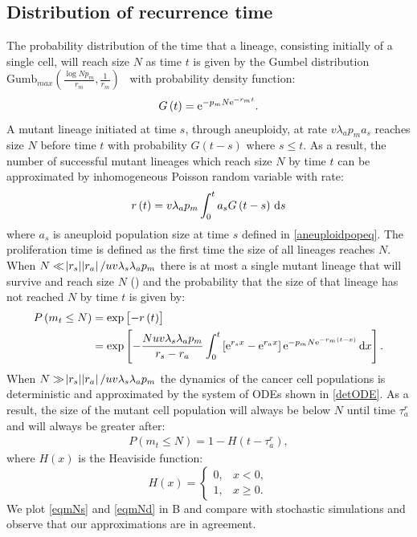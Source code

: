 \documentclass[12pt]{extarticle}
\renewcommand{\d}[1]{\ensuremath{\operatorname{d}\!{#1}}}
\renewcommand{\d}{{\rm d}}
\newcommand{\e}{{\rm e}}
\renewcommand{\Delta}{r}
\begin{document}
\begin{appendices}
\section{Distribution of recurrence time}
The probability distribution of the time that a lineage, consisting initially of a single cell, will reach size $N$ as time $t$ is given by the Gumbel distribution $\text{Gumb}_{max}\left(\frac{\log Np_m}{\Delta_m},\frac{1}{\Delta_m}\right)$~\citep{avanzini2019cancer} with probability density function:
\begin{align*}
G\left(t\right)=\e^{-p_mN\e^{-\Delta_mt}}.
\end{align*}
A mutant lineage initiated at time $s$, through aneuploidy, at rate $v\lambda_ap_ma_s$ reaches size $N$ before time $t$ with probability $G\left(t-s\right)$ where $s\leq t$. As a result, the number of successful mutant lineages which reach size $N$ by time $t$ can be approximated by inhomogeneous Poisson random variable with rate:
\begin{align*}
r\left(t\right)=v\lambda_ap_m\int_0^t a_sG\left(t-s\right)\,\d s
\end{align*}
where $a_s$ is aneuploid population size at time $s$ defined in \cref{aneuploidpopeq}. The proliferation time is defined as the first time the size of all lineages reaches $N$. When $N\ll\abs{\Delta_s}\abs{\Delta_a}/uv\lambda_s\lambda_ap_m$ there is at most a single mutant lineage that will survive and reach size $N$ () and the probability that the size of that lineage has not reached $N$ by time $t$ is given by:
\begin{align}\nonumber
P\left(m_t\leq N\right)&=\exp\left[-r\left(t\right)\right]\\ \label{eqmNs}
&=\exp\left[-\frac{Nuv\lambda_s\lambda_ap_m}{\Delta_s-\Delta_a}\int_0^t\left[\e^{\Delta_sx}-\e^{\Delta_ax}\right]\e^{-p_mN\e^{-\Delta_m\left(t-x\right)}}\,\d x\right].
\end{align}
When $N\gg\abs{\Delta_s}\abs{\Delta_a}/uv\lambda_s\lambda_ap_m$ the dynamics of the cancer cell populations is deterministic and approximated by the system of ODEs shown in \cref{detODE}. As a result, the size of the mutant cell population will always be below $N$ until time $\tau_a^r$ and will always be greater after:
\begin{align}\label{eqmNd}
P\left(m_t\leq N\right)=1-H\left(t-\tau_a^r\right),
\end{align}
where $H(x)$ is the Heaviside function:
\begin{equation*}
H\left(x\right) = \begin{cases}
    0 ,&
  x<0 ,\\ 
  1 ,&
  x\geq0 .
  \end{cases}
\end{equation*}
We plot \cref{eqmNs} and \cref{eqmNd} in B and compare with stochastic simulations and observe that our approximations are in agreement. %


\end{appendices}
\end{document}
